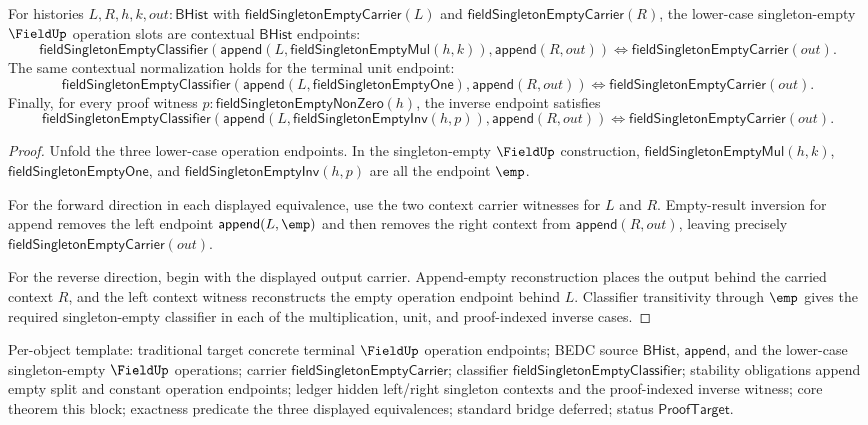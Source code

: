 \begin{theorem}
\label{thm:field-singleton-empty-operation-context-normalization}
For histories $L,R,h,k,out:\mathsf{BHist}$ with
$\mathsf{fieldSingletonEmptyCarrier}(L)$ and
$\mathsf{fieldSingletonEmptyCarrier}(R)$, the lower-case singleton-empty
$\FieldUp$ operation slots are contextual $\mathsf{BHist}$ endpoints:
$$
\mathsf{fieldSingletonEmptyClassifier}
  (\mathsf{append}(L,\mathsf{fieldSingletonEmptyMul}(h,k)),
   \mathsf{append}(R,out))
\Longleftrightarrow
\mathsf{fieldSingletonEmptyCarrier}(out).
$$
The same contextual normalization holds for the terminal unit endpoint:
$$
\mathsf{fieldSingletonEmptyClassifier}
  (\mathsf{append}(L,\mathsf{fieldSingletonEmptyOne}),
   \mathsf{append}(R,out))
\Longleftrightarrow
\mathsf{fieldSingletonEmptyCarrier}(out).
$$
Finally, for every proof witness
$p:\mathsf{fieldSingletonEmptyNonZero}(h)$, the inverse endpoint satisfies
$$
\mathsf{fieldSingletonEmptyClassifier}
  (\mathsf{append}(L,\mathsf{fieldSingletonEmptyInv}(h,p)),
   \mathsf{append}(R,out))
\Longleftrightarrow
\mathsf{fieldSingletonEmptyCarrier}(out).
$$
\end{theorem}
\begin{proof}
Unfold the three lower-case operation endpoints. In the singleton-empty
$\FieldUp$ construction, $\mathsf{fieldSingletonEmptyMul}(h,k)$,
$\mathsf{fieldSingletonEmptyOne}$, and
$\mathsf{fieldSingletonEmptyInv}(h,p)$ are all the endpoint $\emp$.

For the forward direction in each displayed equivalence, use the two context
carrier witnesses for $L$ and $R$. Empty-result inversion for append removes
the left endpoint $\mathsf{append}(L,\emp)$ and then removes the right context
from $\mathsf{append}(R,out)$, leaving precisely
$\mathsf{fieldSingletonEmptyCarrier}(out)$.

For the reverse direction, begin with the displayed output carrier. Append-empty
reconstruction places the output behind the carried context $R$, and the left
context witness reconstructs the empty operation endpoint behind $L$.
Classifier transitivity through $\emp$ gives the required singleton-empty
classifier in each of the multiplication, unit, and proof-indexed inverse
cases.
\end{proof}

Per-object template: traditional target concrete terminal $\FieldUp$ operation
endpoints; BEDC source $\mathsf{BHist}$, $\mathsf{append}$, and the lower-case
singleton-empty $\FieldUp$ operations; carrier
$\mathsf{fieldSingletonEmptyCarrier}$; classifier
$\mathsf{fieldSingletonEmptyClassifier}$; stability obligations append empty
split and constant operation endpoints; ledger hidden left/right singleton
contexts and the proof-indexed inverse witness; core theorem this block;
exactness predicate the three displayed equivalences; standard bridge
deferred; status $\mathsf{ProofTarget}$.

